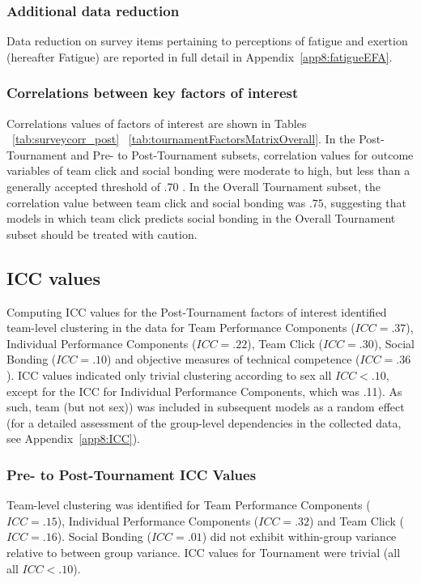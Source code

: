 \begin{CJK}{UTF8}{gbsn}
\subsubsection{Additional data reduction}
Data reduction on survey items pertaining to perceptions of fatigue and exertion (hereafter Fatigue) are reported in full detail in Appendix~\ref{app8:fatigueEFA}.


\subsubsection{Correlations between key factors of interest}
Correlations values of factors of interest are shown in Tables ~\ref{tab:surveycorr_post} \nobreakdash ~\ref{tab:tournamentFactorsMatrixOverall}.  In the Post-Tournament and Pre- to Post-Tournament subsets, correlation values for outcome variables of team click and social bonding were moderate to high, but less than a generally accepted threshold of .70 \citep{Field2012}.  In the Overall Tournament subset, the correlation value between team click and social bonding was $.75$, suggesting that models in which team click predicts social bonding in the Overall Tournament subset should be treated with caution.








\subsection{ICC values}

Computing ICC values for the Post-Tournament factors of interest identified team-level clustering in the data for Team Performance Components ($ICC = .37$), Individual Performance Components ($ICC = .22$), Team Click ($ICC = .30$), Social Bonding ($ICC = .10$) and objective measures of technical competence ($ICC = .36$).  ICC values indicated only trivial clustering according to sex all $ICC < .10$, except for the ICC for Individual Performance Components, which was .11).  As such, team (but not sex)) was included in subsequent models as a random effect (for a detailed assessment of the group-level dependencies in the collected data, see Appendix~\ref{app8:ICC}).


\subsubsection{Pre- to Post-Tournament ICC Values}
Team-level clustering was identified for
Team Performance Components ($ICC = .15$), Individual Performance Components ($ICC = .32$) and Team Click ($ICC = .16$).  Social Bonding ($ICC = .01$) did not exhibit within-group variance relative to between group variance. ICC values for Tournament were trivial (all all $ICC < .10$).


\end{CJK}
